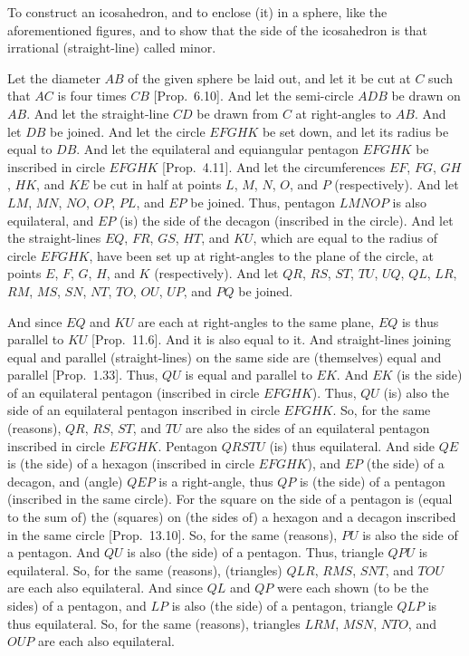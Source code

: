 \begin{Parallel}{}{}
{To construct an icosahedron, and to enclose (it) in a sphere, like the
aforementioned figures, and to show that the side of the
icosahedron is that irrational (straight-line) called minor.

\epsfysize=1.5in
\centerline{}

Let the diameter $AB$ of the given sphere be laid out, and let it be
cut at $C$ such that $AC$ is four times $CB$ [Prop.~6.10]. And
let the semi-circle $ADB$ be drawn on $AB$. And let the straight-line $CD$ be drawn from $C$ at right-angles to $AB$. And let
$DB$ be joined. And let the circle $EFGHK$ be set down,
and let its radius be equal to $DB$.  And let the equilateral and
equiangular pentagon $EFGHK$ be inscribed in circle
$EFGHK$ [Prop.~4.11]. And let the circumferences $EF$, $FG$,
$GH$, $HK$, and $KE$ be cut in half at points $L$, $M$,
$N$, $O$, and $P$ (respectively). And let $LM$, $MN$, $NO$,
$OP$, $PL$, and $EP$ be joined. Thus, pentagon $LMNOP$
is also equilateral, and $EP$ (is) the side of the decagon (inscribed in the circle).
And let the straight-lines $EQ$, $FR$, $GS$, $HT$, and $KU$, which
are equal to the radius of circle $EFGHK$,  have
been set up at right-angles to the plane of the circle, at points $E$, $F$, $G$, $H$, and $K$ (respectively). And let $QR$, $RS$, $ST$, $TU$,
$UQ$, $QL$, $LR$, $RM$, $MS$, $SN$, $NT$, $TO$,
$OU$, $UP$, and $PQ$ be joined.

And since $EQ$ and $KU$ are each at right-angles to the same plane, $EQ$ is thus parallel to $KU$ [Prop.~11.6]. And it is also equal to it. And straight-lines joining equal and parallel (straight-lines) on the same side are
(themselves) equal and parallel [Prop.~1.33]. Thus, $QU$
is equal and parallel to $EK$. And $EK$ (is the side) of an equilateral
pentagon (inscribed in circle $EFGHK$). Thus, $QU$ (is) also  the
side of an equilateral pentagon inscribed in circle $EFGHK$.  So, for the
same (reasons), $QR$, $RS$, $ST$, and $TU$ are also  the sides of
an equilateral pentagon inscribed in circle $EFGHK$. Pentagon
$QRSTU$ (is) thus equilateral. And side $QE$
is (the side) of a hexagon (inscribed in circle $EFGHK$),
and $EP$ (the side) of a decagon, and (angle) $QEP$ is a right-angle, 
thus $QP$ is  (the side) of a pentagon (inscribed in the same circle).
For the square on the side of a pentagon is (equal to the sum of)
the (squares) on (the sides of) a hexagon and a decagon inscribed in the
same circle  [Prop.~13.10]. So, for the same (reasons), $PU$
is also the side of a pentagon. And $QU$ is also (the
side) of a pentagon. Thus, triangle $QPU$ is equilateral. So, for the
same (reasons), (triangles) $QLR$, $RMS$, $SNT$, and $TOU$
are each also equilateral. And since $QL$ and $QP$ were each shown
(to be the sides) of a pentagon,  and $LP$ is  also (the side) of a pentagon, triangle $QLP$ is thus equilateral. So,
for the same (reasons), triangles $LRM$, $MSN$, $NTO$, and
$OUP$ are each also equilateral. 

}
\end{Parallel}
